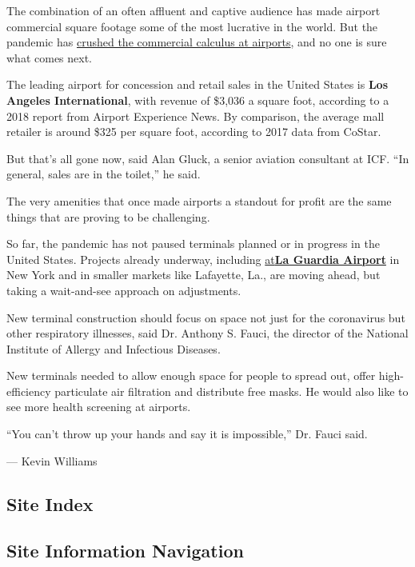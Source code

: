 The combination of an often affluent and captive audience has made
airport commercial square footage some of the most lucrative in the
world. But the pandemic has
\href{https://www.nytimes3xbfgragh.onion/2020/08/18/business/airport-remodeling-coronavirus-safety.html}{crushed
the commercial calculus at airports}, and no one is sure what comes
next.

The leading airport for concession and retail sales in the United States
is \textbf{Los Angeles International}, with revenue of \$3,036 a square
foot, according to a 2018 report from Airport Experience News. By
comparison, the average mall retailer is around \$325 per square foot,
according to 2017 data from CoStar.

But that's all gone now, said Alan Gluck, a senior aviation consultant
at ICF. ``In general, sales are in the toilet,'' he said.

The very amenities that once made airports a standout for profit are the
same things that are proving to be challenging.

So far, the pandemic has not paused terminals planned or in progress in
the United States. Projects already underway, including
\href{https://www.nytimes3xbfgragh.onion/2020/06/10/nyregion/new-la-guardia-airport-terminal.html}{at}\textbf{\href{https://www.nytimes3xbfgragh.onion/2020/06/10/nyregion/new-la-guardia-airport-terminal.html}{La
Guardia Airport}} in New York and in smaller markets like Lafayette,
La., are moving ahead, but taking a wait-and-see approach on
adjustments.

New terminal construction should focus on space not just for the
coronavirus but other respiratory illnesses, said Dr. Anthony S. Fauci,
the director of the National Institute of Allergy and Infectious
Diseases.

New terminals needed to allow enough space for people to spread out,
offer high-efficiency particulate air filtration and distribute free
masks. He would also like to see more health screening at airports.

``You can't throw up your hands and say it is impossible,'' Dr. Fauci
said.

--- Kevin Williams

\hypertarget{site-index}{%
\subsection{Site Index}\label{site-index}}

\hypertarget{site-information-navigation}{%
\subsection{Site Information
Navigation}\label{site-information-navigation}}

